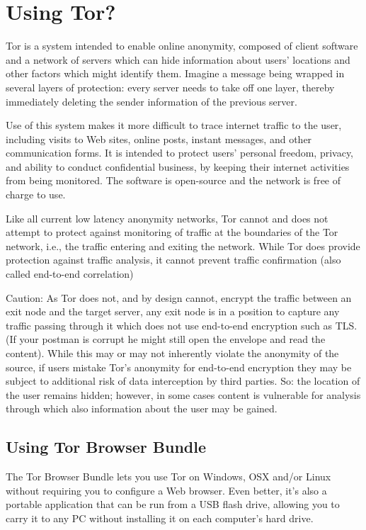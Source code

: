 \section{Using Tor?}

Tor is a system intended to enable online anonymity, composed of client
software and a network of servers which can hide information about
users' locations and other factors which might identify them. Imagine a
message being wrapped in several layers of protection: every server
needs to take off one layer, thereby immediately deleting the sender
information of the previous server.

Use of this system makes it more difficult to trace internet traffic to
the user, including visits to Web sites, online posts, instant messages,
and other communication forms. It is intended to protect users' personal
freedom, privacy, and ability to conduct confidential business, by
keeping their internet activities from being monitored. The software is
open-source and the network is free of charge to use.

Like all current low latency anonymity networks, Tor cannot and does not
attempt to protect against monitoring of traffic at the boundaries of
the Tor network, i.e., the traffic entering and exiting the network.
While Tor does provide protection against traffic analysis, it cannot
prevent traffic confirmation (also called end-to-end correlation)

Caution: As Tor does not, and by design cannot, encrypt the traffic
between an exit node and the target server, any exit node is in a
position to capture any traffic passing through it which does not use
end-to-end encryption such as TLS. (If your postman is corrupt he might
still open the envelope and read the content). While this may or may not
inherently violate the anonymity of the source, if users mistake Tor's
anonymity for end-to-end encryption they may be subject to additional
risk of data interception by third parties. So: the location of the user
remains hidden; however, in some cases content is vulnerable for
analysis through which also information about the user may be gained.

\subsection{Using Tor Browser Bundle}

The Tor Browser Bundle lets you use Tor on Windows, OSX and/or Linux
without requiring you to configure a Web browser. Even better, it's also
a portable application that can be run from a USB flash drive, allowing
you to carry it to any PC without installing it on each computer's hard
drive.

